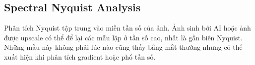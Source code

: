 \subsection{Spectral Nyquist Analysis}
Phân tích Nyquist tập trung vào miền tần số của ảnh. Ảnh sinh bởi AI hoặc ảnh được upscale có thể để lại các mẫu lặp ở tần số cao, nhất là gần biên Nyquist. Những mẫu này không phải lúc nào cũng thấy bằng mắt thường nhưng có thể xuất hiện khi phân tích gradient hoặc phổ tần số.
